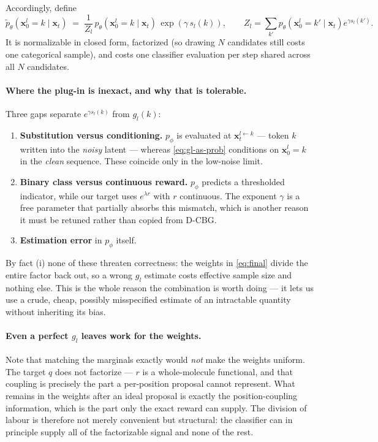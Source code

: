 \documentclass[11pt]{article}
\newcommand{\x}{\mathbf{x}}
\begin{document}
Accordingly, define
\begin{equation}
\tilde{p}_\theta\!\left(\x_0^l = k \mid \x_t\right)
  \;=\; \frac{1}{Z_l}\,
        p_\theta\!\left(\x_0^l = k \mid \x_t\right)\,
        \exp\!\left(\gamma\, s_l(k)\right),
\qquad
Z_l = \sum_{k'} p_\theta\!\left(\x_0^l = k' \mid \x_t\right)
      e^{\gamma s_l(k')} .
\label{eq:proposal}
\end{equation}
It is normalizable in closed form, factorized (so drawing $N$ candidates still
costs one categorical sample), and costs one classifier evaluation per step
shared across all $N$ candidates.

\paragraph{Where the plug-in is inexact, and why that is tolerable.}
Three gaps separate $e^{\gamma s_l(k)}$ from $g_l(k)$:
\begin{enumerate}
  \item \textbf{Substitution versus conditioning.} $p_\phi$ is evaluated at
        $\x_t^{l \leftarrow k}$ --- token $k$ written into the \emph{noisy}
        latent --- whereas \eqref{eq:gl-as-prob} conditions on
        $\x_0^l = k$ in the \emph{clean} sequence. These coincide only in the
        low-noise limit.
  \item \textbf{Binary class versus continuous reward.} $p_\phi$ predicts a
        thresholded indicator, while our target uses $e^{\lambda r}$ with $r$
        continuous. The exponent $\gamma$ is a free parameter that partially
        absorbs this mismatch, which is another reason it must be retuned
        rather than copied from D-CBG.
  \item \textbf{Estimation error} in $p_\phi$ itself.
\end{enumerate}
By fact (i) none of these threaten correctness: the weights in
\eqref{eq:final} divide the entire factor back out, so a wrong $g_l$ estimate
costs effective sample size and nothing else. This is the whole reason the
combination is worth doing --- it lets us use a crude, cheap, possibly
misspecified estimate of an intractable quantity without inheriting its bias.

\paragraph{Even a perfect $g_l$ leaves work for the weights.} Note that
matching the marginals exactly would \emph{not} make the weights uniform. The
target $q$ does not factorize --- $r$ is a whole-molecule functional, and that
coupling is precisely the part a per-position proposal cannot represent. What
remains in the weights after an ideal proposal is exactly the position-coupling
information, which is the part only the exact reward can supply. The division of
labour is therefore not merely convenient but structural: the classifier can in
principle supply all of the factorizable signal and none of the rest.
\end{document}
